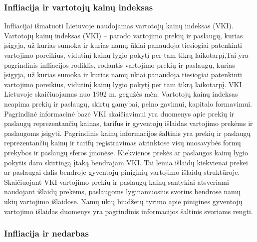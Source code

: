 \documentclass[a4paper]{article}
\begin{document}
		\subsubsection{Infliacija ir vartotojų kainų indeksas}
		
Infliacijai išmatuoti Lietuvoje naudojamas vartotojų kainų indeksas (VKI). Vartotojų kainų indeksas (VKI) – parodo vartojimo prekių ir paslaugų, kurias įsigyja, už kurias sumoka ir kurias namų ūkiai panaudoja tiesiogiai patenkinti vartojimo poreikius, vidutinį kainų lygio pokytį per tam tikrą laikotarpį,Tai yra pagrindinis infliacijos rodiklis, rodantis vartojimo prekių ir paslaugų, kurias įsigyja, už kurias sumoka ir kurias namų ūkiai panaudoja tiesiogiai patenkinti vartojimo poreikius, vidutinį kainų lygio pokytį per tam tikrą laikotarpį. VKI Lietuvoje skaičiuojamas nuo 1992 m. gegužės mėn. Vartotojų kainų indeksas neapima prekių ir paslaugų, skirtų gamybai, pelno gavimui, kapitalo formavimui.\\
Pagrindinė informacinė bazė VKI skaičiavimui yra duomenys apie prekių ir paslaugų reprezentančių kainas, tarifus ir gyventojų išlaidas vartojimo prekėms ir paslaugoms įsigyti. Pagrindinis kainų informacijos šaltinis yra prekių ir paslaugų reprezentančių kainų ir tarifų registravimas atrinktose visų nuosavybės formų prekybos ir paslaugų sferos įmonėse. Kiekvienos prekės ar paslaugos kainų lygio pokytis daro skirtingą įtaką bendrajam VKI. Tai lemia išlaidų kiekvienai prekei ar paslaugai dalis bendroje gyventojų piniginių vartojimo išlaidų struktūroje. Skaičiuojant VKI vartojimo prekių ir paslaugų kainų santykiai atsveriami naudojant išlaidų prekėms, paslaugoms lyginamuosius svorius bendrose namų ūkių vartojimo išlaidose. Namų ūkių biudžetų tyrimo apie pinigines gyventojų vartojimo išlaidas duomenys yra pagrindinis informacijos šaltinis svoriams rengti.

\newpage \subsubsection{Infliacija ir nedarbas}
		
\end{document}
